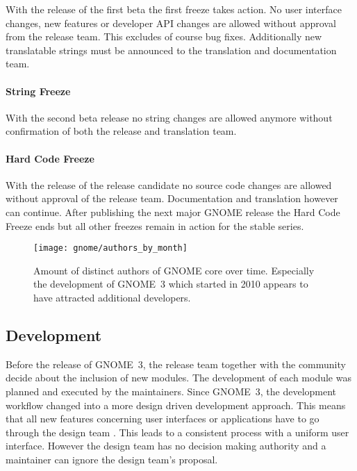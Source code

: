 With the release of the first beta the first freeze takes action. No user
interface changes, new features or developer \ac{API} changes are allowed
without approval from the release team. This excludes of course bug fixes.
Additionally new translatable strings must be announced to the translation and
documentation team.

\paragraph{String Freeze}

With the second beta release no string changes are allowed anymore without
confirmation of both the release and translation team.

\paragraph{Hard Code Freeze}

With the release of the release candidate no source code changes are allowed
without approval of the release team. Documentation and translation however can
continue. After publishing the next major GNOME release the Hard Code Freeze
ends but all other freezes remain in action for the stable series.

\begin{figure}[htbp]
  \centering
  \texttt{[image: gnome/authors\_by\_month]}
  \caption[Authors by month, GNOME]
  {Amount of distinct authors of GNOME core over time. Especially the
    development of GNOME~3 which started in 2010 appears to have attracted
    additional developers.}
\end{figure}


\subsection{Development} %

Before the release of GNOME~3, the release team together with the community
decide about the inclusion of new modules. The development of each module was
planned and executed by the maintainers. Since GNOME~3, the development
workflow changed into a more design driven development approach. This means
that all new features concerning user interfaces or applications have to go
through the design team \cite{GNOMEDesignTeam}. This leads to a consistent
process with a uniform user interface. However the design team has no decision
making authority and a maintainer can ignore the design team's proposal.

